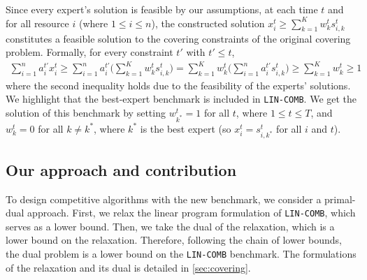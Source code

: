 Since every expert's solution is feasible by our assumptions, at each time $t$ and for all resource $i$ (where $1 \leq i \leq n$),
the constructed solution $x_{i}^{t} \geq \sum_{k=1}^{K} w_{k}^{t} s_{i,k}^{t}$ constitutes a feasible solution to the covering constraints of the original covering problem.
Formally, for every constraint $t'$ with $t' \leq t$,
%
\begin{align*}
\sum_{i=1}^{n} a_{i}^{t'} x_{i}^{t} \geq
%
\sum_{i=1}^{n} a_{i}^{t'} \biggl( \sum_{k=1}^{K} w_{k}^{t} s_{i,k}^{t} \biggr)
%
	= \sum_{k=1}^{K} w_{k}^{t}  \biggl( \sum_{i=1}^{n} a_{i}^{t'} s_{i,k}^{t} \biggr)
%
	\geq \sum_{k=1}^{K} w_{k}^{t} \geq 1
\end{align*}
%
where the second inequality holds due to the feasibility of the experts' solutions.
%
%
We highlight that the best-expert benchmark is included in \texttt{LIN-COMB}. We get the solution of this benchmark by setting $w^{t}_{k^{*}} = 1$ for all $t$, where $1 \leq t \leq T$, and $w^{t}_{k} = 0$ for all $k \neq k^{*}$,
where $k^{*}$ is the best expert (so $x_{i}^{t} = s_{i,k^{*}}^{t}$ for all $i$ and $t$).

\subsection{Our approach and contribution}

To design competitive algorithms with the new benchmark, we consider a primal-dual approach. First, we relax the linear program formulation of \texttt{LIN-COMB}, which serves as a lower bound. Then, we take the dual of the relaxation, which is a lower bound on the relaxation. Therefore, following the chain of lower bounds, the dual problem is a lower bound on the \texttt{LIN-COMB} benchmark. The formulations of the relaxation and its dual is detailed in \cref{sec:covering}.

